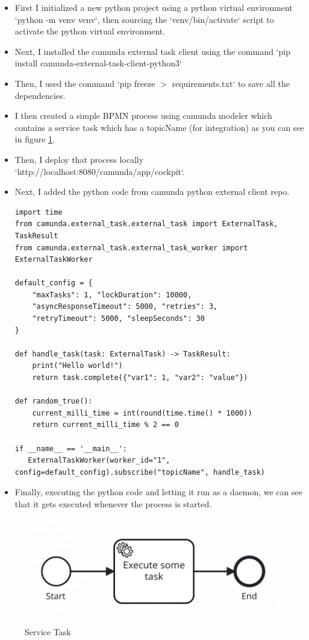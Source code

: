 \documentclass[12pt]{article}
\begin{document}
{  \begin{itemize}[noitemsep,nolistsep]
    \item First I initialized a new python project using a python virtual environment `python -m venv venv`, then sourcing the `venv/bin/activate` script to activate the python virtual environment.
    \item Next, I installed the camunda external task client using the command `pip install camunda-external-task-client-python3`
    \item Then, I used the command `pip freeze $ > $ requirements.txt` to save all the dependencies.
    \item I then created a simple BPMN process using camunda modeler which contains a service task which has a topicName (for integration) as you can see in figure \ref{fig:service_task}.
    \item Then, I deploy that process locally `http://localhost:8080/camunda/app/cockpit`.
   
    \pagebreak

    \item Next, I added the python code from camunda python external client repo.
\begin{lstlisting}
import time
from camunda.external_task.external_task import ExternalTask, TaskResult
from camunda.external_task.external_task_worker import ExternalTaskWorker

default_config = {
    "maxTasks": 1, "lockDuration": 10000,
    "asyncResponseTimeout": 5000, "retries": 3,
    "retryTimeout": 5000, "sleepSeconds": 30
}

def handle_task(task: ExternalTask) -> TaskResult:
    print("Hello world!")
    return task.complete({"var1": 1, "var2": "value"}) 

def random_true():
    current_milli_time = int(round(time.time() * 1000))
    return current_milli_time % 2 == 0

if __name__ == '__main__':
   ExternalTaskWorker(worker_id="1", config=default_config).subscribe("topicName", handle_task)
\end{lstlisting}

    \item Finally, executing the python code and letting it run as a daemon, we can see that it gets executed whenever the process is started.
  \end{itemize}

  \begin{figure}[h]
    \centering
    \includegraphics[width=.37\linewidth]{service_task.png}
    \caption{Service Task}
    \label{fig:service_task}
  \end{figure}

}
\end{document}
